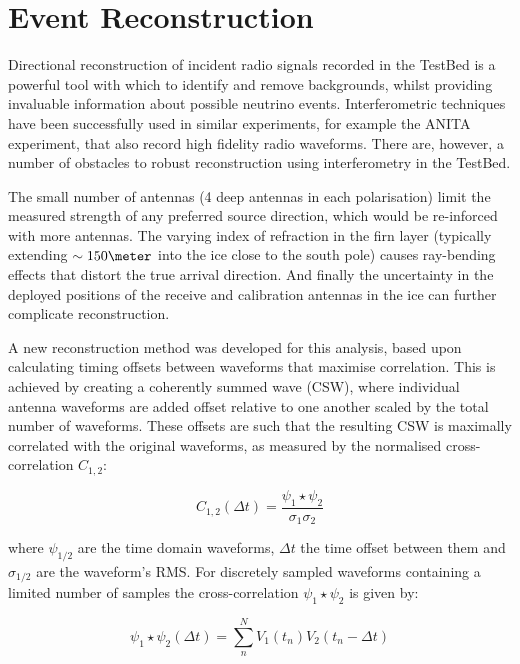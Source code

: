 \section{Event Reconstruction}
\label{sec:Analysis:Reconstruction}

Directional reconstruction of incident radio signals recorded in the TestBed is a powerful tool with which to identify and remove backgrounds, whilst providing invaluable information about possible neutrino events. Interferometric techniques have been successfully used in similar experiments, for example the ANITA experiment, that also record high fidelity radio waveforms. There are, however, a number of obstacles to robust reconstruction using interferometry in the TestBed. 

The small number of antennas (4 deep antennas in each polarisation) limit the measured strength of any preferred source direction, which would be re-inforced with more antennas. The varying index of refraction in the firn layer (typically extending $\sim 150 \meter$ into the ice close to the south pole) causes ray-bending effects that distort the true arrival direction. And finally the uncertainty in the deployed positions of the receive and calibration antennas in the ice can further complicate reconstruction. 


A new reconstruction method was developed for this analysis, based upon calculating timing offsets between waveforms that maximise correlation. This is achieved by creating a coherently summed wave (CSW), where individual antenna waveforms are added offset relative to one another scaled by the total number of waveforms. These offsets are such that the resulting CSW is maximally correlated with the original waveforms, as measured by the normalised cross-correlation $C_{1,2}$:


\begin{equation}
  C_{1,2}(\Delta t) = \frac{\psi_{1} \star \psi_{2}}{\sigma_{1} \sigma_{2}}
  \label{eq:analysis:Reconstruction:Normalised-Cross-Correlation}
\end{equation}

\noindent where $\psi_{1/2}$ are the time domain waveforms, $\Delta t$ the time offset between them and $\sigma_{1/2}$ are the waveform's RMS. For discretely sampled waveforms containing a limited number of samples the cross-correlation $\psi_{1} \star \psi_{2}$ is given by:

\begin{equation}
  \psi_{1} \star \psi_{2} (\Delta t) = \sum_{n}^{N} V_{1}(t_{n}) V_{2}(t_{n}-\Delta t)
  \label{eq:analysis:Reconstruction:Discrete-Cross-Correlation}
\end{equation}

